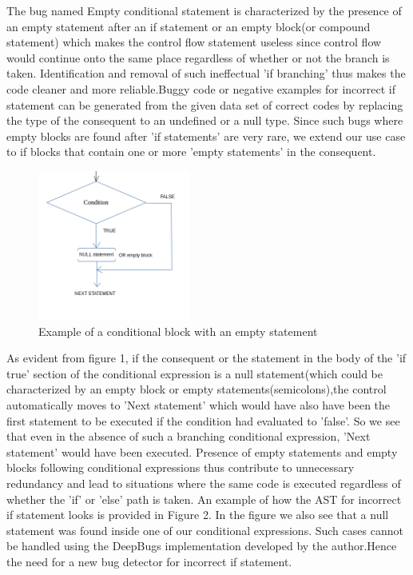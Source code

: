 \documentclass[sigconf]{acmart}
\begin{document}
\fi
\par
The bug named Empty conditional statement is characterized by the presence of an empty statement after an if statement or an empty block(or compound statement) which makes the control flow statement useless since control flow would continue onto the same place regardless of whether or not the branch is taken.\newline
\newline Identification and removal of such ineffectual 'if branching' thus makes the code cleaner and more reliable.Buggy code or negative examples for incorrect if statement can be generated from the given data set of correct codes by replacing the type of the consequent to an undefined or a null type. Since such bugs where empty blocks are found after 'if statements' are very rare, we extend our use case to if blocks that contain one or more 'empty statements' in the consequent. 
\begin{figure}[h!]
\includegraphics[width=50mm]{untitled(2).png}
\caption{Example of a conditional block with an empty statement}
\end{figure}
As evident from figure 1, if the consequent or the statement in the body of the 'if true' section of the conditional expression is a null statement(which could be characterized by an empty block or empty statements(semicolons),the control automatically moves to 'Next statement' which would have also have been the first statement to be executed if the condition had evaluated to 'false'. So we see that even in the absence of such a branching conditional expression, 'Next statement' would have been executed. 
Presence of empty statements and empty blocks following conditional expressions thus contribute to unnecessary redundancy and lead to situations where the same code is executed regardless of whether the 'if' or 'else' path is taken. 
\newline An example of how the AST for incorrect if statement looks is provided in Figure 2. In the figure we also see that a null statement was found inside one of our conditional expressions. Such cases cannot be handled using the DeepBugs implementation developed by the author.Hence the need for a new bug detector for incorrect if statement. 
\end{document}
